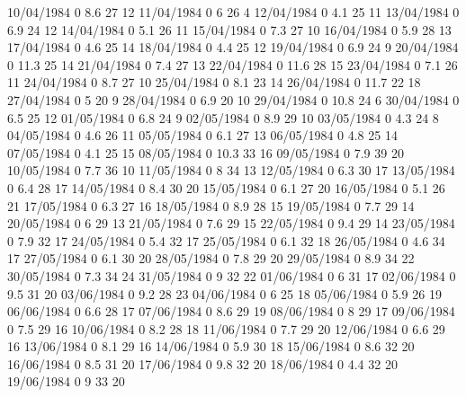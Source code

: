 10/04/1984  0      8.6    27     12 
11/04/1984  0      6      26     4 
12/04/1984  0      4.1    25     11 
13/04/1984  0      6.9    24     12 
14/04/1984  0      5.1    26     11 
15/04/1984  0      7.3    27     10 
16/04/1984  0      5.9    28     13 
17/04/1984  0      4.6    25     14 
18/04/1984  0      4.4    25     12 
19/04/1984  0      6.9    24     9 
20/04/1984  0      11.3   25     14 
21/04/1984  0      7.4    27     13 
22/04/1984  0      11.6   28     15 
23/04/1984  0      7.1    26     11 
24/04/1984  0      8.7    27     10 
25/04/1984  0      8.1    23     14 
26/04/1984  0      11.7   22     18 
27/04/1984  0      5      20     9 
28/04/1984  0      6.9    20     10 
29/04/1984  0      10.8   24     6 
30/04/1984  0      6.5    25     12 
01/05/1984  0      6.8    24     9 
02/05/1984  0      8.9    29     10 
03/05/1984  0      4.3    24     8 
04/05/1984  0      4.6    26     11 
05/05/1984  0      6.1    27     13 
06/05/1984  0      4.8    25     14 
07/05/1984  0      4.1    25     15 
08/05/1984  0      10.3   33     16 
09/05/1984  0      7.9    39     20 
10/05/1984  0      7.7    36     10 
11/05/1984  0      8      34     13 
12/05/1984  0      6.3    30     17 
13/05/1984  0      6.4    28     17 
14/05/1984  0      8.4    30     20 
15/05/1984  0      6.1    27     20 
16/05/1984  0      5.1    26     21 
17/05/1984  0      6.3    27     16 
18/05/1984  0      8.9    28     15 
19/05/1984  0      7.7    29     14 
20/05/1984  0      6      29     13 
21/05/1984  0      7.6    29     15 
22/05/1984  0      9.4    29     14 
23/05/1984  0      7.9    32     17 
24/05/1984  0      5.4    32     17 
25/05/1984  0      6.1    32     18 
26/05/1984  0      4.6    34     17 
27/05/1984  0      6.1    30     20 
28/05/1984  0      7.8    29     20 
29/05/1984  0      8.9    34     22 
30/05/1984  0      7.3    34     24 
31/05/1984  0      9      32     22 
01/06/1984  0      6      31     17 
02/06/1984  0      9.5    31     20 
03/06/1984  0      9.2    28     23 
04/06/1984  0      6      25     18 
05/06/1984  0      5.9    26     19 
06/06/1984  0      6.6    28     17 
07/06/1984  0      8.6    29     19 
08/06/1984  0      8      29     17 
09/06/1984  0      7.5    29     16 
10/06/1984  0      8.2    28     18 
11/06/1984  0      7.7    29     20 
12/06/1984  0      6.6    29     16 
13/06/1984  0      8.1    29     16 
14/06/1984  0      5.9    30     18 
15/06/1984  0      8.6    32     20 
16/06/1984  0      8.5    31     20 
17/06/1984  0      9.8    32     20 
18/06/1984  0      4.4    32     20 
19/06/1984  0      9      33     20 
